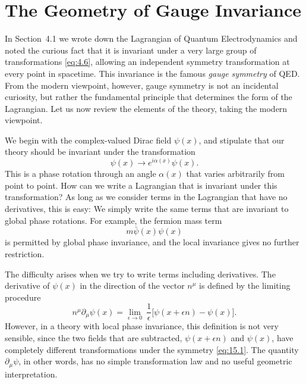 \section{The Geometry of Gauge Invariance}

In Section~4.1 we wrote down the Lagrangian of Quantum Electrodynamics and
noted the curious fact that it is invariant under a very large group of
transformations \eqref{eq:4.6}, allowing an independent symmetry
transformation at every point in spacetime.  This invariance is the famous
\emph{gauge symmetry} of QED.  From the modern viewpoint, however, gauge
symmetry is not an incidental curiosity, but rather the fundamental principle
that determines the form of the Lagrangian.  Let us now review the elements
of the theory, taking the modern viewpoint.

We begin with the complex-valued Dirac field $\psi(x)$, and stipulate that our
theory should be invariant under the transformation
\begin{equation}
  \psi(x) \to e^{i\alpha(x)}\psi(x) .
  \label{eq:15.1}
\end{equation}
This is a phase rotation through an angle $\alpha(x)$ that varies arbitrarily
from point to point.  How can we write a Lagrangian that is invariant under
this transformation?  As long as we consider terms in the Lagrangian that
have no derivatives, this is easy: We simply write the same terms that are
invariant to global phase rotations.  For example, the fermion mass term
\begin{equation}
  m\bar{\psi}(x)\psi(x)
\end{equation}
is permitted by global phase invariance, and the local invariance gives no
further restriction.

The difficulty arises when we try to write terms including derivatives.  The
derivative of $\psi(x)$ in the direction of the vector $n^\mu$ is defined by the
limiting procedure
\begin{equation}
  n^\mu\partial_\mu\psi(x) = \lim_{\epsilon\to 0}\ \frac{1}{\epsilon}\bigl[
    \psi(x+\epsilon n) - \psi(x) \bigr] .
  \label{eq:15.2}
\end{equation}
However, in a theory with local phase invariance, this definition is not very
sensible, since the two fields that are subtracted, $\psi(x+\epsilon n)$ and
$\psi(x)$, have completely different transformations under the symmetry
\eqref{eq:15.1}.  The quantity $\partial_\mu\psi$, in other words, has no
simple transformation law and no useful geometric interpretation.

